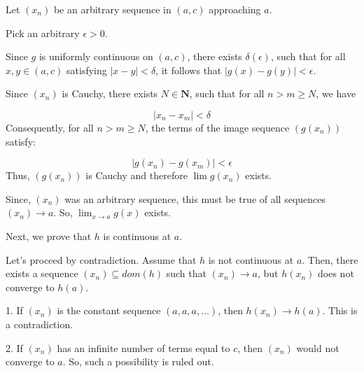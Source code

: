 \documentclass[10pt]{article}
\begin{document}
Let $\displaystyle ( x_{n})$ be an arbitrary sequence in $\displaystyle ( a,c)$ approaching $\displaystyle a$. 



Pick an arbitrary $\displaystyle \epsilon  >0$. 



Since $\displaystyle g$ is uniformly continuous on $\displaystyle ( a,c)$, there exists $\displaystyle \delta ( \epsilon )$, such that for all $\displaystyle x,y\in ( a,c)$ satisfying $\displaystyle |x-y|< \delta $, it follows that $\displaystyle |g( x) -g( y) |< \epsilon $.



Since $\displaystyle ( x_{n})$ is Cauchy, there exists $\displaystyle N\in \mathbf{N}$, such that for all $\displaystyle n >m\geq N$, we have 


\begin{equation*}
|x_{n} -x_{m} |< \delta 
\end{equation*}
Consequently, for all $\displaystyle n >m\geq N$, the terms of the image sequence $\displaystyle ( g( x_{n}))$ satisfy:


\begin{equation*}
|g( x_{n}) -g( x_{m}) |< \epsilon 
\end{equation*}
Thus, $\displaystyle ( g( x_{n}))$ is Cauchy and therefore $\displaystyle \lim g( x_{n})$ exists. 



Since, $\displaystyle ( x_{n})$ was an arbitrary sequence, this must be true of all sequences $\displaystyle ( x_{n})\rightarrow a$. So, $\displaystyle \lim _{x\rightarrow a} g( x)$ exists. 



Next, we prove that $\displaystyle h$ is continuous at $\displaystyle a$. 



Let's proceed by contradiction. Assume that $\displaystyle h$ is not continuous at $\displaystyle a$. Then, there exists a sequence $\displaystyle ( x_{n}) \subseteq dom( h)$ such that $\displaystyle ( x_{n})\rightarrow a$, but $\displaystyle h( x_{n})$ does not converge to $\displaystyle h( a)$.



1. If $\displaystyle ( x_{n})$ is the constant sequence $\displaystyle ( a,a,a,\dotsc )$, then $\displaystyle h( x_{n})\rightarrow h( a)$. This is a contradiction.



2. If $\displaystyle ( x_{n})$ has an infinite number of terms equal to $\displaystyle c$, then $\displaystyle ( x_{n})$ would not converge to $\displaystyle a$. So, such a possibility is ruled out.
\end{document}
